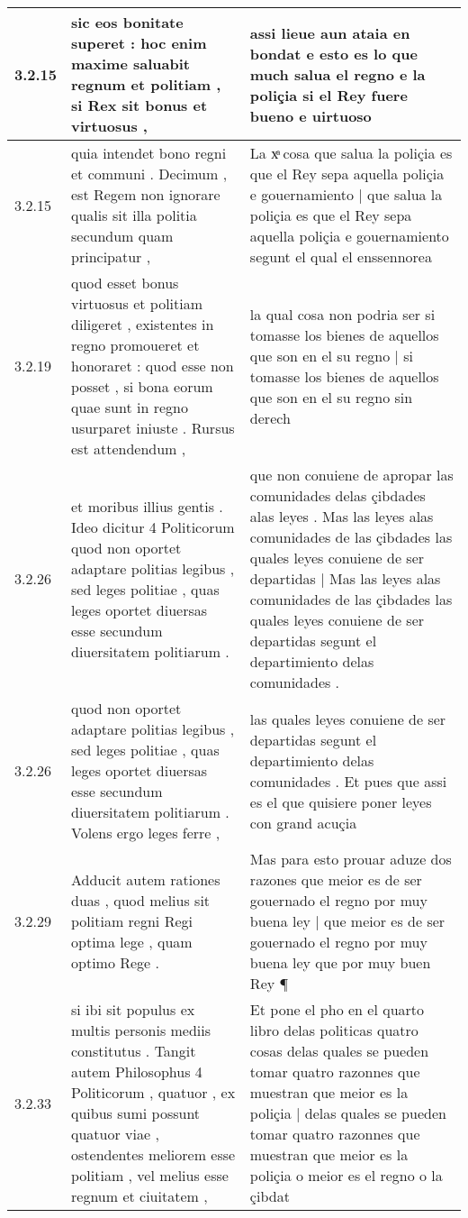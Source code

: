 \begin{tabular}{|p{1cm}|p{6.5cm}|p{6.5cm}|}
3.2.15 & sic eos bonitate superet : hoc enim maxime saluabit regnum et politiam , si Rex sit bonus et virtuosus , & assi lieue aun ataia en bondat e esto es lo que much salua el regno e la poliçia si el Rey fuere bueno e uirtuoso \\\hline
3.2.15 & quia intendet bono regni et communi . Decimum , est Regem non ignorare qualis sit illa politia secundum quam principatur , & La xͣ cosa que salua la poliçia es que el Rey sepa aquella poliçia e gouernamiento | que salua la poliçia es que el Rey sepa aquella poliçia e gouernamiento segunt el qual el enssennorea \\\hline
3.2.19 & quod esset bonus virtuosus et politiam diligeret , existentes in regno promoueret et honoraret : quod esse non posset , si bona eorum quae sunt in regno usurparet iniuste . Rursus est attendendum , & la qual cosa non podria ser si tomasse los bienes de aquellos que son en el su regno | si tomasse los bienes de aquellos que son en el su regno sin derech \\\hline
3.2.26 & et moribus illius gentis . Ideo dicitur 4 Politicorum quod non oportet adaptare politias legibus , sed leges politiae , quas leges oportet diuersas esse secundum diuersitatem politiarum . & que non conuiene de apropar las comunidades delas çibdades alas leyes . Mas las leyes alas comunidades de las çibdades las quales leyes conuiene de ser departidas | Mas las leyes alas comunidades de las çibdades las quales leyes conuiene de ser departidas segunt el departimiento delas comunidades . \\\hline
3.2.26 & quod non oportet adaptare politias legibus , sed leges politiae , quas leges oportet diuersas esse secundum diuersitatem politiarum . Volens ergo leges ferre , & las quales leyes conuiene de ser departidas segunt el departimiento delas comunidades . Et pues que assi es el que quisiere poner leyes con grand acuçia \\\hline
3.2.29 & Adducit autem rationes duas , quod melius sit politiam regni Regi optima lege , quam optimo Rege . & Mas para esto prouar aduze dos razones que meior es de ser gouernado el regno por muy buena ley | que meior es de ser gouernado el regno por muy buena ley que por muy buen Rey ¶ \\\hline
3.2.33 & si ibi sit populus ex multis personis mediis constitutus . Tangit autem Philosophus 4 Politicorum , quatuor , ex quibus sumi possunt quatuor viae , ostendentes meliorem esse politiam , vel melius esse regnum et ciuitatem , & Et pone el pho en el quarto libro delas politicas quatro cosas delas quales se pueden tomar quatro razonnes que muestran que meior es la poliçia | delas quales se pueden tomar quatro razonnes que muestran que meior es la poliçia o meior es el regno o la çibdat \\\hline

\end{tabular}
